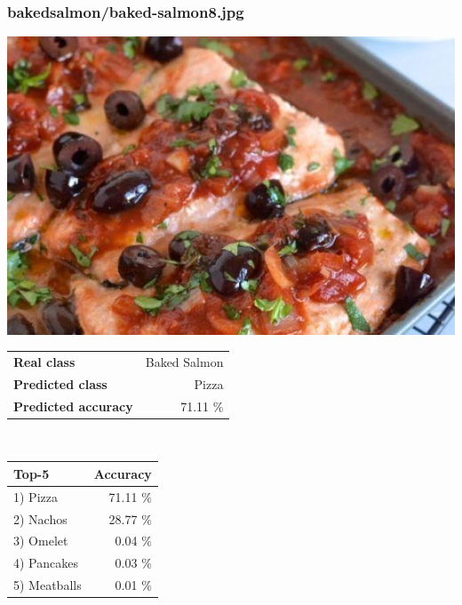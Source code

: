 \subsubsection{baked\textunderscore salmon/baked-salmon8.jpg}

\begin{minipage}[t]{0.4\textwidth}
	\vspace{0pt}
	\includegraphics[width=\linewidth]{images/evaluation-images/baked_salmon/baked-salmon8.jpg}
\end{minipage}
\hfill
\begin{minipage}[t]{0.5\textwidth}
	\vspace{0pt}\raggedright
	\begin{tabularx}{\textwidth}{X r}
		\small \textbf{Real class} & \small Baked Salmon\\
		\small \textbf{Predicted class} & \small Pizza\\
		\small \textbf{Predicted accuracy} & \small 71.11 \%
    \end{tabularx}\\
    
    \vspace{6pt}
	\begin{tabularx}{\textwidth}{X r}
        \small \textbf{Top-5} & \small \textbf{Accuracy} \\
        \hline
		\small 1) Pizza & \small 71.11 \%\\\small 2) Nachos & \small 28.77 \%\\\small 3) Omelet & \small 0.04 \%\\\small 4) Pancakes & \small 0.03 \%\\\small 5) Meatballs & \small 0.01 \%
    \end{tabularx}
\end{minipage}
    
